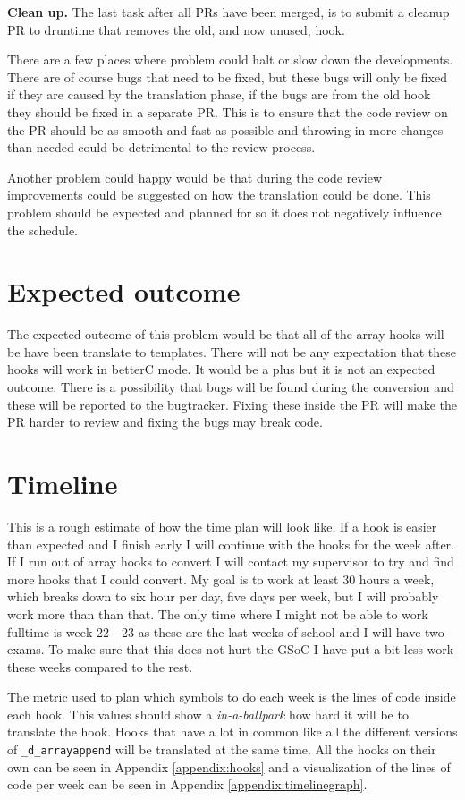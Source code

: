 \documentclass[10pt,a4paper]{article}
\begin{document}
\textbf{Clean up.} The last task after all PRs have been merged, is to submit a 
cleanup PR to druntime that removes the old, and now unused, hook.

There are a few places where problem could halt or slow down the developments. 
There are of course bugs that need to be fixed, but these bugs will only be 
fixed if they are caused by the translation phase, if the bugs are from the old 
hook they should be fixed in a separate PR. This is to ensure that the code 
review on the PR should be as smooth and fast as possible and throwing in more 
changes than needed could be detrimental to the review process.

Another problem could happy would be that during the code review improvements 
could be suggested on how the translation could be done. This problem should be 
expected and planned for so it does not negatively influence the schedule.


\section{Expected outcome}
The expected outcome of this problem would be that all of the array hooks will 
be have been translate to templates. There will not be any expectation that 
these hooks will work in betterC mode. It would be a plus but it is not an 
expected outcome. There is a possibility that bugs will be found during the 
conversion and these will be reported to the bugtracker. Fixing these inside the 
PR will make the PR harder to review and fixing the bugs may break code.

\section{Timeline}
This is a rough estimate of how the time plan will look like. If a hook is 
easier than expected and I finish early I will continue with the hooks for the 
week after. If I run out of array hooks to convert I will contact my supervisor 
to try and find more hooks that I could convert.
My goal is to work at least 30 hours a week, which breaks down to six hour per 
day, five days per week, but I will probably work more than than that. The only
time where I might not be able to work fulltime is week 22 - 23 as these are the
last weeks of school and I will have two exams. To make sure that this does not
hurt the GSoC I have put a bit less work these weeks compared to the rest.

The metric used to plan which symbols to do each week is the lines of code 
inside each hook. This values should show a \textit{in-a-ballpark} how hard it 
will be to translate the hook. Hooks that have a lot in common like all the 
different versions of \texttt{_d_arrayappend} will be translated at the 
same time. All the hooks on their own can be seen in Appendix \ref{appendix:hooks}
and a visualization of the lines of code per week can be seen in Appendix \ref{appendix:timelinegraph}.
\end{document}
